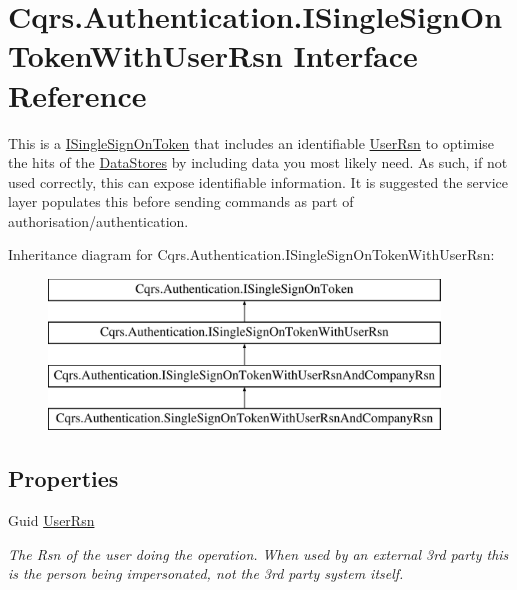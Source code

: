 \hypertarget{interfaceCqrs_1_1Authentication_1_1ISingleSignOnTokenWithUserRsn}{}\section{Cqrs.\+Authentication.\+I\+Single\+Sign\+On\+Token\+With\+User\+Rsn Interface Reference}
\label{interfaceCqrs_1_1Authentication_1_1ISingleSignOnTokenWithUserRsn}


This is a \hyperlink{interfaceCqrs_1_1Authentication_1_1ISingleSignOnToken}{I\+Single\+Sign\+On\+Token} that includes an identifiable \hyperlink{interfaceCqrs_1_1Authentication_1_1ISingleSignOnTokenWithUserRsn_a3ba8dbde50e032ebc76c96a5ff40f47f_a3ba8dbde50e032ebc76c96a5ff40f47f}{User\+Rsn} to optimise the hits of the \hyperlink{}{Data\+Stores} by including data you most likely need. As such, if not used correctly, this can expose identifiable information. It is suggested the service layer populates this before sending commands as part of authorisation/authentication.  


Inheritance diagram for Cqrs.\+Authentication.\+I\+Single\+Sign\+On\+Token\+With\+User\+Rsn\+:\begin{figure}[H]
\begin{center}
\leavevmode
\includegraphics[height=4.000000cm]{interfaceCqrs_1_1Authentication_1_1ISingleSignOnTokenWithUserRsn}
\end{center}
\end{figure}
\subsection*{Properties}
\begin{DoxyCompactItemize}
\item 
Guid \hyperlink{interfaceCqrs_1_1Authentication_1_1ISingleSignOnTokenWithUserRsn_a3ba8dbde50e032ebc76c96a5ff40f47f_a3ba8dbde50e032ebc76c96a5ff40f47f}{User\+Rsn}
\begin{DoxyCompactList}\small\item\em The Rsn of the user doing the operation. When used by an external 3rd party this is the person being impersonated, not the 3rd party system itself. \end{DoxyCompactList}\end{DoxyCompactItemize}
